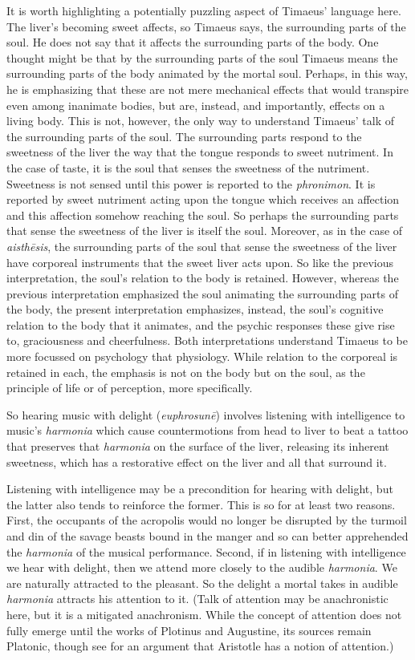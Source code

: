 It is worth highlighting a potentially puzzling aspect of Timaeus' language here. The liver's becoming sweet affects, so Timaeus says, the surrounding parts of the soul. He does not say that it affects the surrounding parts of the body. One thought might be that by the surrounding parts of the soul Timaeus means the surrounding parts of the body animated by the mortal soul. Perhaps, in this way, he is emphasizing that these are not mere mechanical effects that would transpire even among inanimate bodies, but are, instead, and importantly, effects on a living body. This is not, however, the only way to understand Timaeus' talk of the surrounding parts of the soul. The surrounding parts respond to the sweetness of the liver the way that the tongue responds to sweet nutriment. In the case of taste, it is the soul that senses the sweetness of the nutriment. Sweetness is not sensed until this power is reported to the \emph{phronimon}. It is reported by sweet nutriment acting upon the tongue which receives an affection and this affection somehow reaching the soul. So perhaps the surrounding parts that sense the sweetness of the liver is itself the soul. Moreover, as in the case of \emph{aisthēsis}, the surrounding parts of the soul that sense the sweetness of the liver have corporeal instruments that the sweet liver acts upon. So like the previous interpretation, the soul's relation to the body is retained. However, whereas the previous interpretation emphasized the soul animating the surrounding parts of the body, the present interpretation emphasizes, instead, the soul's cognitive relation to the body that it animates, and the psychic responses these give rise to, graciousness and cheerfulness. Both interpretations understand Timaeus to be more focussed on psychology that physiology. While relation to the corporeal is retained in each, the emphasis is not on the body but on the soul, as the principle of life or of perception, more specifically.

So hearing music with delight (\emph{euphrosunē}) involves listening with intelligence to music's \emph{harmonia} which cause countermotions from head to liver to beat a tattoo that preserves that \emph{harmonia} on the surface of the liver, releasing its inherent sweetness, which has a restorative effect on the liver and all that surround it. 

Listening with intelligence may be a precondition for hearing with delight, but the latter also tends to reinforce the former. This is so for at least two reasons. First, the occupants of the acropolis would no longer be disrupted by the turmoil and din of the savage beasts bound in the manger and so can better apprehended the \emph{harmonia} of the musical performance. Second, if in listening with intelligence we hear with delight, then we attend more closely to the audible \emph{harmonia}. We are naturally attracted to the pleasant. So the delight a mortal takes in audible \emph{harmonia} attracts his attention to it. (Talk of attention may be anachronistic here, but it is a mitigated anachronism. While the concept of attention does not fully emerge until the works of Plotinus and Augustine, its sources remain Platonic, though see \citealt{FiecconiForthcoming-FIEAOA} for an argument that Aristotle has a notion of attention.)

